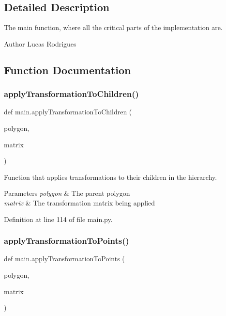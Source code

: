 \subsection{Detailed Description}
The main function, where all the critical parts of the implementation are. 

\begin{DoxyAuthor}{Author}
Lucas Rodrigues 
\end{DoxyAuthor}


\subsection{Function Documentation}
\mbox{\label{namespacemain_aeae47c61066756f699b19bf97f937370}} 
\subsubsection{\texorpdfstring{apply\+Transformation\+To\+Children()}{applyTransformationToChildren()}}
{\footnotesize\ttfamily def main.\+apply\+Transformation\+To\+Children (\begin{DoxyParamCaption}\item[{}]{polygon,  }\item[{}]{matrix }\end{DoxyParamCaption})}



Function that applies transformations to their children in the hierarchy. 


\begin{DoxyParams}{Parameters}
{\em polygon} & The parent polygon \\
\hline
{\em matrix} & The transformation matrix being applied \\
\hline
\end{DoxyParams}


Definition at line 114 of file main.\+py.

\mbox{\label{namespacemain_a69cc12fb1c27fecdfcac61f5d4e917b9}} 
\subsubsection{\texorpdfstring{apply\+Transformation\+To\+Points()}{applyTransformationToPoints()}}
{\footnotesize\ttfamily def main.\+apply\+Transformation\+To\+Points (\begin{DoxyParamCaption}\item[{}]{polygon,  }\item[{}]{matrix }\end{DoxyParamCaption})}



